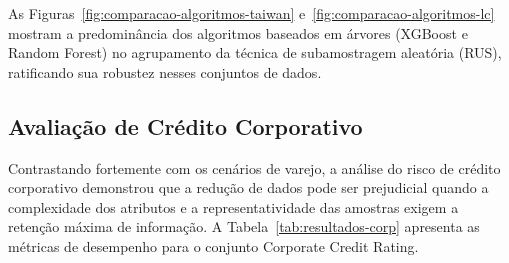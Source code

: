 As Figuras~\ref{fig:comparacao-algoritmos-taiwan} e~\ref{fig:comparacao-algoritmos-lc} mostram a predominância dos algoritmos baseados em árvores (XGBoost e Random Forest) no agrupamento da técnica de subamostragem aleatória (RUS), ratificando sua robustez nesses conjuntos de dados.

\subsection{Avaliação de Crédito Corporativo}\label{sec:analise-corp}

Contrastando fortemente com os cenários de varejo, a análise do risco de crédito corporativo demonstrou que a redução de dados pode ser prejudicial quando a complexidade dos atributos e a representatividade das amostras exigem a retenção máxima de informação. A Tabela~\ref{tab:resultados-corp} apresenta as métricas de desempenho para o conjunto Corporate Credit Rating.

